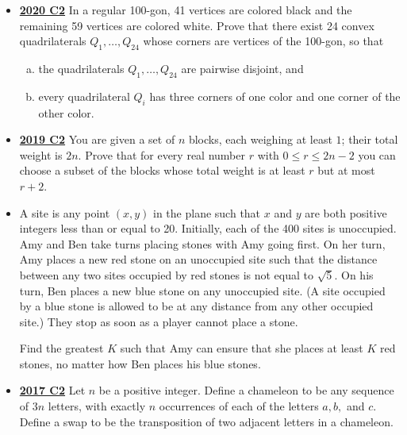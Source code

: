 \documentclass[11pt]{scrartcl}
\begin{document}
\begin{itemize}[leftmargin=*]
    \item \href{https://artofproblemsolving.com/community/c6h2625840p22697894}{\textbf{2020 C2}}  In a regular 100-gon, 41 vertices are colored black and the remaining 59 vertices are colored white. Prove that there exist 24 convex quadrilaterals $Q_{1}, \dots, Q_{24}$ whose corners are vertices of the 100-gon, so that
    \begin{enumerate}[(a)]
        \item the quadrilaterals $Q_{1}, \dots, Q_{24}$ are pairwise disjoint, and
        \item every quadrilateral $Q_{i}$ has three corners of one color and one corner of the other color.
    \end{enumerate}
    \item \href{https://artofproblemsolving.com/community/c6h2279034p17829157}{\textbf{2019 C2}} You are given a set of $n$ blocks, each weighing at least $1$; their total weight is $2n$. Prove that for every real number $r$ with $0 \leqslant r \leqslant 2n-2$ you can choose a subset of the blocks whose total weight is at least $r$ but at most $r + 2$.
    \item {} A site is any point $(x, y)$ in the plane such that $x$ and $y$ are both positive integers less than or equal to 20. Initially, each of the 400 sites is unoccupied. Amy and Ben take turns placing stones with Amy going first. On her turn, Amy places a new red stone on an unoccupied site such that the distance between any two sites occupied by red stones is not equal to $\sqrt{5}$. On his turn, Ben places a new blue stone on any unoccupied site. (A site occupied by a blue stone is allowed to be at any distance from any other occupied site.) They stop as soon as a player cannot place a stone. 
    
    Find the greatest $K$ such that Amy can ensure that she places at least $K$ red stones, no matter how Ben places his blue stones.
    \item \href{https://artofproblemsolving.com/community/c6h1671304p10632393}{\textbf{2017 C2}} Let $n$ be a positive integer. Define a chameleon to be any sequence of $3n$ letters, with exactly $n$ occurrences of each of the letters $a, b,$ and $c$. Define a swap to be the transposition of two adjacent letters in a chameleon. 
    

\end{itemize}
\end{document}
